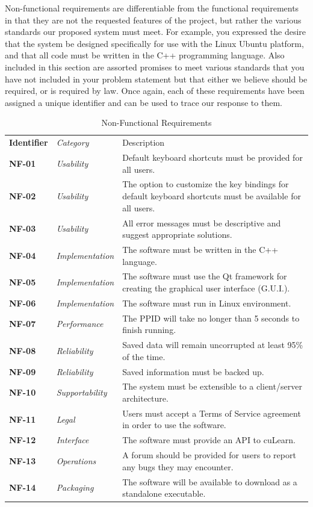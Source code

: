 \documentclass[12pt,letterpaper]{article}
\begin{document}
Non-functional requirements are differentiable from the functional requirements in that they are not the requested features of the project, but
rather the various standards our proposed system must meet. For example, you expressed the desire that the system be designed specifically 
for use with the Linux Ubuntu platform, and that all code must be written in the C++ programming language. Also included in this section are
assorted promises to meet various standards that you have not included in your problem statement but that either we believe should be required, 
or is required by law. Once again, each of these requirements have been assigned a unique identifier and can be used to trace our response to them.

\begin{table}[H]
	\caption{Non-Functional Requirements}
	\vspace{1em}
	\begin{tabu} to 
	    \tableheader{}Identifier & Category & Description\\
		NF-01 & Usability & Default keyboard shortcuts must be provided for all users. \\
		NF-02 & Usability & The option to customize the key bindings for default keyboard shortcuts must be available for all users.\\
		NF-03 & Usability & All error messages must be descriptive and suggest appropriate solutions.\\
		NF-04 & Implementation & The software must be written in the C++ language. \\
		NF-05 & Implementation & The software must use the Qt framework for creating the graphical user interface (G.U.I.). \\
		NF-06 & Implementation & The software must run in Linux environment. \\
		NF-07 & Performance & The PPID will take no longer than 5 seconds to finish running. \\
		NF-08 & Reliability & Saved data will remain uncorrupted at least 95\% of the time. \\
		NF-09 & Reliability & Saved information must be backed up. \\
		NF-10 & Supportability & The system must be extensible to a client/server architecture. \\
		NF-11 & Legal & Users must accept a Terms of Service agreement in order to use the software.\\
		NF-12 & Interface & The software must provide an API to cuLearn.\\
		NF-13 & Operations & A forum should be provided for users to report any bugs they may encounter. \\
		NF-14 & Packaging & The software will be available to download as a standalone executable. \\
	\end{tabu}
\end{table}
\end{document}
